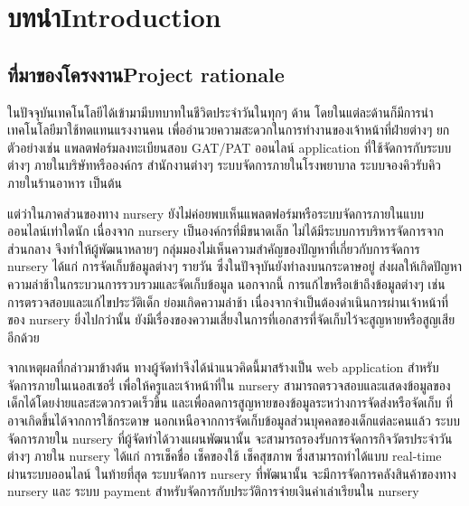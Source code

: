 \chapter{\ifcpe บทนำ\else Introduction\fi}

\section{\ifcpe ที่มาของโครงงาน\else Project rationale\fi}

ในปัจจุบันเทคโนโลยีได้เข้ามามีบทบาทในชีวิตประจําวันในทุกๆ ด้าน โดยในแต่ละด้านก็มีการนําเทคโนโลยีมาใช้ทดแทนแรงงานคน  เพื่ออํานวยความสะดวกในการทํางานของเจ้าหน้าที่ฝ่ายต่างๆ  ยกตัวอย่างเช่น แพลตฟอร์มลงทะเบียนสอบ GAT/PAT ออนไลน์ application ที่ใช้จัดการกับระบบต่างๆ ภายในบริษัทหรือองค์กร สำนักงานต่างๆ ระบบจัดการภายในโรงพยาบาล ระบบจองคิวรับคิวภายในร้านอาหาร เป็นต้น

แต่ว่าในภาคส่วนของทาง nursery ยังไม่ค่อยพบเห็นแพลตฟอร์มหรือระบบจัดการภายในแบบออนไลน์เท่าใดนัก
เนื่องจาก nursery เป็นองค์กรที่มีขนาดเล็ก ไม่ได้มีระบบการบริหารจัดการจากส่วนกลาง จึงทำให้ผู้พัฒนาหลายๆ กลุ่มมองไม่เห็นความสำคัญของปัญหาที่เกี่ยวกับการจัดการ nursery ได้แก่ การจัดเก็บข้อมูลต่างๆ รายวัน ซึ่งในปัจจุบันยังทำลงบนกระดาษอยู่ ส่งผลให้เกิดปัญหาความล่าช้าในกระบวนการรวบรวมและจัดเก็บข้อมูล
นอกจากนี้ การแก้ไขหรือเข้าถึงข้อมูลต่างๆ เช่น การตรวจสอบและแก้ไขประวัติเด็ก ย่อมเกิดความล่าช้า เนื่องจากจำเป็นต้องดำเนินการผ่านเจ้าหน้าที่ของ nursery ยิ่งไปกว่านั้น ยังมีเรื่องของความเสี่ยงในการที่เอกสารที่จัดเก็บไว้จะสูญหายหรือสูญเสียอีกด้วย

จากเหตุผลที่กล่าวมาข้างต้น ทางผู้จัดทําจึงได้นำแนวคิดนี้มาสร้างเป็น web application 
สําหรับจัดการภายในเนอสเซอรี่ เพื่อให้ครูและเจ้าหน้าที่ใน nursery สามารถตรวจสอบและแสดงข้อมูลของเด็กได้โดยง่ายและสะดวกรวดเร็วขึ้น และเพื่อลดการสูญหายของข้อมูลระหว่างการจัดส่งหรือจัดเก็บ ที่อาจเกิดขึ้นได้จากการใช้กระดาษ
นอกเหนือจากการจัดเก็บข้อมูลส่วนบุคคลของเด็กแต่ละคนแล้ว ระบบจัดการภายใน nursery ที่ผู้จัดทำได้วางแผนพัฒนานั้น จะสามารถรองรับการจัดการกิจวัตรประจำวันต่างๆ ภายใน nursery ได้แก่ การเช็คชื่อ เช็คของใช้ เช็คสุขภาพ
ซึ่งสามารถทำได้แบบ real-time ผ่านระบบออนไลน์
ในท้ายที่สุด ระบบจัดการ nursery ที่พัฒนานั้น จะมีการจัดการคลังสินค้าของทาง nursery และ ระบบ payment สำหรับจัดการกับประวัติการจ่ายเงินค่าเล่าเรียนใน nursery



